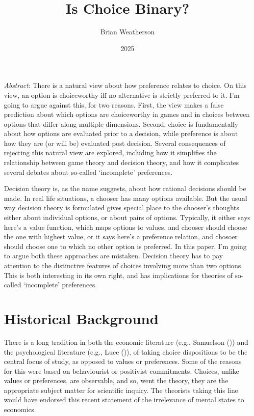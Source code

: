 \documentclass[
  11pt,
  letterpaper,
  DIV=11,
  numbers=noendperiod,
  twoside]{scrartcl}
\title{Is Choice Binary?}
\author{Brian Weatherson}
\date{2025}
\renewenvironment{abstract}
 {\vspace{-1.25cm}
 \quotation\small\noindent\emph{Abstract}:}
 {\endquotation}
\begin{document}
\maketitle
\begin{abstract}
There is a natural view about how preference relates to choice. On this
view, an option is choiceworthy iff no alternative is strictly preferred
to it. I'm going to argue against this, for two reasons. First, the view
makes a false prediction about which options are choiceworthy in games
and in choices between options that differ along multiple dimensions.
Second, choice is fundamentally about how options are evaluated prior to
a decision, while preference is about how they are (or will be)
evaluated post decision. Several consequences of rejecting this natural
view are explored, including how it simplifies the relationship between
game theory and decision theory, and how it complicates several debates
about so-called `incomplete' preferences.
\end{abstract}


Decision theory is, as the name suggests, about how rational decisions
should be made. In real life situations, a chooser has many options
available. But the usual way decision theory is formulated gives special
place to the chooser's thoughts either about individual options, or
about pairs of options. Typically, it either says here's a value
function, which maps options to values, and chooser should choose the
one with highest value, or it says here's a preference relation, and
chosoer should choose one to which no other option is preferred. In this
paper, I'm going to argue both these approaches are mistaken. Decision
theory has to pay attention to the distinctive features of choices
involving more than two options. This is both interesting in its own
right, and has implications for theories of so-called `incomplete'
preferences.

\section{Historical Background}\label{sec-history}

There is a long tradition in both the economic literature (e.g.,
Samuelson ()) and the psychological
literature (e.g., Luce ()), of taking
choice dispositions to be the central focus of study, as opposed to
values or preferences. Some of the reasons for this were based on
behaviourist or positivist commitments. Choices, unlike values or
preferences, are observable, and so, went the theory, they are the
appropriate subject matter for scientific inquiry. The theorists taking
this line would have endorsed this recent statement of the irrelevance
of mental states to economics.
\end{document}
